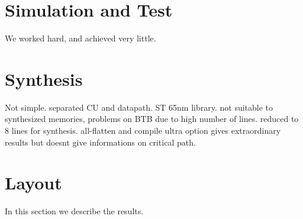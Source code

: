 \documentclass[12pt]{article}
\begin{document}
\section{Simulation and Test}\label{Conclusions}
We worked hard, and achieved very little.

\section{Synthesis}\label{Synthesis}
Not simple. separated CU and datapath.
ST 65nm library. not suitable to synthesized memories, problems on BTB due to high number of lines. reduced to 8 lines for synthesis. 
all-flatten and compile ultra option gives extraordinary results but doesnt give informations on critical path.



\section{Layout}\label{Layout}
In this section we describe the results.



\end{document}
